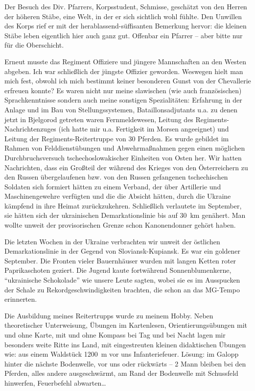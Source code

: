 Der Besuch des Div. Pfarrers, Korpsstudent, Schmisse, geschätzt von den Herren der höheren Stäbe, eine Welt, in der er sich sichtlich wohl fühlte. Den Unwillen des Korps rief er mit der herablassend-süffisanten Bemerkung hervor: die kleinen Stäbe leben eigentlich hier auch ganz gut. Offenbar ein Pfarrer -- aber bitte nur für die Oberschicht.

Erneut musste das Regiment Offiziere und jüngere Mannschaften an den Westen abgeben. Ich war schließlich der jüngste Offizier geworden. Weswegen hielt man mich fest, obwohl ich mich bestimmt keiner besonderen Gunst von der Chevallerie erfreuen konnte? Es waren nicht nur meine slawischen (wie auch französischen) Sprachkenntnisse sondern auch meine sonstigen Spezialitäten: Erfahrung in der Anlage und im Bau von Stellungssystemen, Bataillonsadjutants u.a. zu denen jetzt in Bjelgorod getreten waren Fernmeldewesen, Leitung des Regiments-Nachrichtenzuges (ich hatte mir u.a. Fertigkeit im Morsen angeeignet) und Leitung der Regiments-Reitertruppe von 30 Pferden. Es wurde gebildet im Rahmen von Felddienstübungen und Abwehrmaßnahmen gegen einen möglichen Durchbruchsversuch tschechoslowakischer Einheiten von Osten her. Wir hatten Nachrichten, dass ein Großteil der während des Krieges von den Österreichern zu den Russen übergelaufenen bzw. von den Russen gefangenen tschechischen Soldaten sich formiert hätten zu einem Verband, der über Artillerie und Maschinengewehre verfügten und die die Absicht hätten, durch die Ukraine kämpfend in ihre Heimat zurückzukehren. Schließlich verlautete im September, sie hätten sich der ukrainischen Demarkationslinie bis auf 30~km genähert. Man wollte unweit der provisorischen Grenze schon Kanonendonner gehört haben.

Die letzten Wochen in der Ukraine verbrachten wir unweit der östlichen Demarkationslinie in der Gegend von Sloviansk-Kupiansk. Es war ein goldener September. Die Fronten vieler Bauernhäuser wurden mit langen Ketten roter Paprikaschoten geziert. Die Jugend kaute fortwährend Sonnenblumenkerne, \enquote{ukrainische Schokolade} wie unsere Leute sagten, wobei sie es im Ausspucken der Schale zu Rekordgeschwindigkeiten brachten, die schon an das MG-Tempo erinnerten.

Die Ausbildung meines Reitertrupps wurde zu meinem Hobby. Neben theoretischer Unterweisung, Übungen im Kartenlesen, Orientierungsübungen mit und ohne Karte, mit und ohne Kompass bei Tag und bei Nacht lagen mir besonders weite Ritte ins Land, mit eingestreuten kleinen didaktischen Übungen wie: aus einem Waldstück 1200~m vor uns Infanteriefeuer. Lösung: im Galopp hinter die nächste Bodenwelle, vor uns oder rückwärts -- 2 Mann bleiben bei den Pferden, alles andere ausgeschwärmt, am Rand der Bodenwelle mit Schussfeld hinwerfen, Feuerbefehl abwarten\dots

